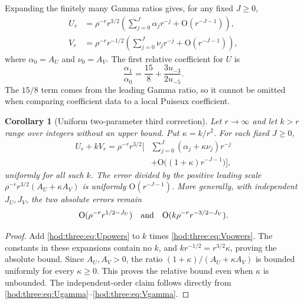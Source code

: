 \documentclass[11pt,letterpaper]{article}
\newtheorem{corollary}[theorem]{Corollary}
\theoremstyle{definition}\newtheorem{definition}[theorem]{Definition}
\theoremstyle{remark}\newtheorem{remark}[theorem]{Remark}
\newcommand{\OO}{\mathrm O}
\begin{document}
Expanding the finitely many Gamma ratios gives, for any fixed $J\ge0$,
\begin{align}
U_r&=\rho^{-r}r^{3/2}\left(\sum_{j=0}^J\alpha_jr^{-j}+\OO(r^{-J-1})\right),\label{hod:three:eq:Upowers}\\
V_r&=\rho^{-r}r^{-1/2}\left(\sum_{j=0}^J\nu_jr^{-j}+\OO(r^{-J-1})\right),\label{hod:three:eq:Vpowers}
\end{align}
where $\alpha_0=A_U$ and $\nu_0=A_V$. The first relative coefficient for $U$ is
\begin{equation}\label{hod:three:eq:Ufirstrel}
\frac{\alpha_1}{\alpha_0}=\frac{15}{8}+\frac{3u_{-3}}{2u_{-5}}.
\end{equation}
The $15/8$ term comes from the leading Gamma ratio, so it cannot be omitted when comparing coefficient data to a local Puiseux coefficient.

\begin{corollary}[Uniform two-parameter third correction]\label{hod:three:cor:crossover}
Let $r\to\infty$ and let $k>r$ range over integers without an upper bound. Put $\kappa=k/r^2$. For each fixed $J\ge0$,
\begin{equation}\label{hod:three:eq:crossover}
\begin{split}
U_r+kV_r=\rho^{-r}r^{3/2}\bigg[&\sum_{j=0}^J(\alpha_j+\kappa\nu_j)r^{-j}\\
&+\OO\big((1+\kappa)r^{-J-1}\big)\bigg],
\end{split}
\end{equation}
uniformly for all such $k$. The error divided by the positive leading scale
$\rho^{-r}r^{3/2}(A_U+\kappa A_V)$ is uniformly $\OO(r^{-J-1})$.
More generally, with independent $J_U,J_V$, the two absolute errors remain
\begin{equation}\label{hod:three:eq:separateUVerrors}
\OO(\rho^{-r}r^{1/2-J_U})\quad\hbox{and}\quad
\OO(k\rho^{-r}r^{-3/2-J_V}).
\end{equation}
\end{corollary}
\begin{proof}
Add \eqref{hod:three:eq:Upowers} to $k$ times \eqref{hod:three:eq:Vpowers}. The constants in these expansions contain no $k$, and $k r^{-1/2}=r^{3/2}\kappa$, proving the absolute bound. Since $A_U,A_V>0$, the ratio $(1+\kappa)/(A_U+\kappa A_V)$ is bounded uniformly for every $\kappa\ge0$. This proves the relative bound even when $\kappa$ is unbounded. The independent-order claim follows directly from \eqref{hod:three:eq:Ugamma}--\eqref{hod:three:eq:Vgamma}.
\end{proof}
\end{document}
